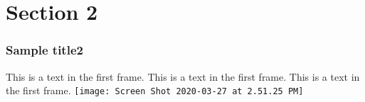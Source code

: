 \documentclass{beamer}
\begin{document}
\section{Section 2}
\begin{frame}
\frametitle{Sample title2}
This is a text in the first frame. This is a text in the first frame. This is a text in the first frame.
\texttt{[image: Screen Shot 2020-03-27 at 2.51.25 PM]}
\end{frame}

  
\end{document}
